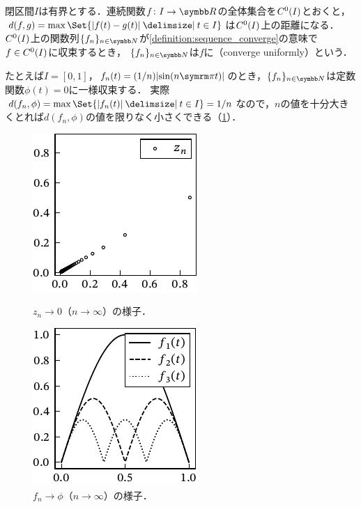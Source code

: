\documentclass[../../main]{subfiles}
\begin{document}
\begin{example}[一様収束]
  \label{example:uniform_converge}
  閉区間\(I\)は有界とする．連続関数\(f\colon I\to\numset{R}\)の全体集合を\(C^0(I)\)とおくと，\(d(f,g)=\max\Set{\abs{f(t)-g(t)}\given t\in I}\)は\(C^0(I)\)上の距離になる．
  \(C^0(I)\)上の関数列\(\seq{f_n}_{n\in\numset{N}}\)が\cref{definition:sequence_converge}の意味で\(f\in C^0(I)\)に収束するとき，
  \(\seq{f_n}_{n\in\numset{N}}\)は\(f\)に（converge uniformly）という．

  たとえば\(I=[0,1]\)，\(f_n(t)=(1/n)\abs{\sin(n\krez t)}\)のとき，\(\seq{f_n}_{n\in\numset{N}}\)は定数関数\(\phi(t)=0\)に一様収束する．
  実際\(d(f_n,\phi)=\max\Set{\abs{f_n(t)}\given t\in I}=1/n\)なので，\(n\)の値を十分大きくとれば\(d(f_n,\phi)\)の値を限りなく小さくできる（\cref{figure:uniform_converge}）．
\end{example}

\begin{figure}[htbp]
  \begin{minipage}{0.5\linewidth}
    \centering
    \includegraphics{figures/complex_convergence.pdf}
    \caption{\(z_n\to 0\)（\(n\to\infty\)）の様子．}
    \label{figure:sequence_converge}
  \end{minipage}%
  \begin{minipage}{0.5\linewidth}
    \centering
    \includegraphics{figures/func_convergence.pdf}
    \caption{\(f_n\to\phi\)（\(n\to\infty\)）の様子．}
    \label{figure:uniform_converge}
  \end{minipage}
\end{figure}
\end{document}
